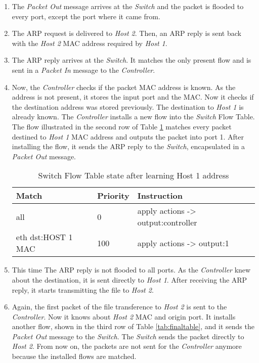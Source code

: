 \begin{enumerate}
\item The \textit{Packet Out} message arrives at the \textit{Switch} and the packet is flooded to every port, except the port where it came from.

\item The ARP request is delivered to \textit{Host 2}. Then, an ARP reply is sent back with the \textit{Host 2} MAC address required by \textit{Host 1}.

\item The ARP reply arrives at the \textit{Switch}. It matches the only present flow and is sent in a \textit{Packet In} message to the  \textit{Controller}.   

\item Now, the  \textit{Controller} checks if the packet MAC address is known. As the address is not present, it stores the input port and the MAC. Now it checks if the destination address was stored previously. The destination to \textit{Host 1} is already known. The  \textit{Controller} installs a new flow into the \textit{Switch} Flow Table. The flow illustrated in the second row of Table \ref{tab:secondtable} matches every packet destined to \textit{Host 1} MAC address and outputs the packet into port 1. After installing the flow, it sends the ARP reply to the \textit{Switch}, encapsulated in a \textit{Packet Out} message.

\begin{table}[H]
\centering
\caption{Switch Flow Table state after learning Host 1 address}
\label{tab:secondtable}
\begin{tabular}{|l|l|l|}
\hline
\textbf{Match}                 & \textbf{Priority}   & \textbf{Instruction}                              \\ \hline
all                            & 0                   & apply actions -> output:controller                \\ \hline
eth dst:HOST 1 MAC             & 100                 & apply actions -> output:1                         \\ \hline
\end{tabular}
\end{table}

\item This time The ARP reply is not flooded to all ports. As the  \textit{Controller} knew about the destination, it is sent directly to \textit{Host 1}. After receiving the ARP reply, it starts transmitting the file to \textit{Host 2}.

\item Again, the first packet of the file transference to \textit{Host 2} is sent to the  \textit{Controller}. Now it knows about \textit{Host 2} MAC and origin port. It installs another flow, shown in the third row of Table \ref{tab:finaltable}, and it sends the \textit{Packet Out} message to the \textit{Switch}. The \textit{Switch} sends the packet directly to \textit{Host 2}. From now on, the packets are not sent for the \textit{Controller} anymore because the installed flows are matched. 


\end{enumerate}
